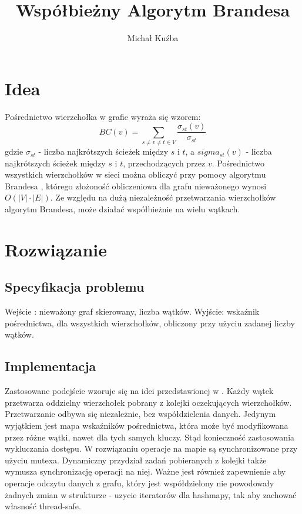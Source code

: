 \documentclass[]{article}
\title{Współbieżny Algorytm Brandesa}
\author{Michał Kuźba}
\begin{document}
\maketitle

\section{Idea}
Pośrednictwo wierzchołka w grafie wyraża się wzorem:
\[BC(v) = \sum_{s\neq v\neq t \in V}^{} \frac{\sigma_{st}(v)}{\sigma_{st}}\]
gdzie \(\sigma_{st}\) - liczba najkrótszych ścieżek między \(s\) i \(t\),
a \(sigma_{st}(v)\) - liczba najkrótszych ścieżek między \(s\) i \(t\), przechodzących przez \(v\).
Pośrednictwo wszystkich wierzchołków w sieci można obliczyć przy pomocy algorytmu Brandesa \parencite{brandes:01}, którego złożoność obliczeniowa dla grafu nieważonego wynosi \(O(|V|\cdot|E|)\).
Ze względu na dużą niezależność przetwarzania wierzchołków algorytm Brandesa, może działać współbieżnie na wielu wątkach.

\section{Rozwiązanie}
\subsection{Specyfikacja problemu}
Wejście : nieważony graf skierowany, liczba wątków.\newline
Wyjście: wskaźnik pośrednictwa, dla wszystkich wierzchołków, obliczony przy użyciu zadanej liczby wątków.

\subsection{Implementacja}
Zastosowane podejście wzoruje się na idei przedstawionej w \parencite[p. 539-550]{bader:06}. Każdy wątek przetwarza oddzielny wierzchołek pobrany z kolejki oczekujących wierzchołków. Przetwarzanie odbywa się niezależnie, bez współdzielenia danych. Jedynym wyjątkiem jest mapa wskaźników pośrednictwa, która może być modyfikowana przez różne wątki, nawet dla tych samych kluczy. Stąd konieczność zastosowania wykluczania dostępu. W rozwiązaniu operacje na mapie są synchronizowane przy użyciu mutexa. Dynamiczny przydział zadań pobieranych z kolejki także wymusza synchronizację operacji na niej. Ważne jest również zapewnienie aby operacje odczytu danych z grafu, który jest współdzielony nie powodowały żadnych zmian w strukturze - uzycie iteratorów dla hashmapy, tak aby zachować własność thread-safe. \newline
\end{document}
